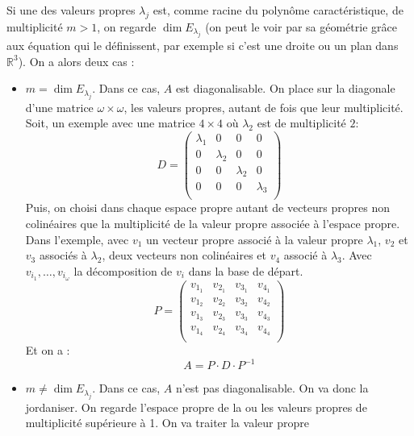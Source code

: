 \documentclass[a4paper,10pt]{article}
\newcommand{\RR}{\mathbb{R}} %
\begin{document}
\begin{enumerate}
      Si une des valeurs propres $\lambda_j$ est, comme racine du
      polynôme caractéristique, de multiplicité $m > 1$, on regarde
      $\dim E_{\lambda_j}$ (on peut le voir par sa géométrie grâce aux
      équation qui le définissent, par exemple si c'est une droite ou
      un plan dans $\RR^3$). On a alors deux cas :
      \begin{itemize}
       \item $m = \dim E_{\lambda_j}$. Dans ce cas, $A$ est
        diagonalisable. On place sur la diagonale d'une matrice $\omega
        \times \omega$, les valeurs propres, autant de fois que leur
        multiplicité. Soit, un exemple avec une matrice $4\times 4$
        où $\lambda_2$ est de multiplicité $2$:
         $$D=
         \begin{pmatrix}
              \lambda_1 & 0         & 0         & 0         \\
              0         & \lambda_2 & 0         & 0         \\
              0         & 0         & \lambda_2 & 0         \\
              0         & 0         & 0         & \lambda_3 \\
             \end{pmatrix}
         $$ Puis, on choisi dans chaque espace propre autant de vecteurs
        propres non colinéaires que la multiplicité de la valeur propre
        associée à l'espace propre. Dans l'exemple, avec $v_1$ un vecteur
        propre associé à la valeur propre $\lambda_1$, $v_2$ et $v_3$
        associés à $\lambda_2$, deux vecteurs non colinéaires et $v_4$
        associé à $\lambda_3$. Avec $v_{i_1},\hdots,v_{i_\omega}$ la
        décomposition de $v_i$ dans la base de départ.  $$P=
        \begin{pmatrix}
              v_{1_1} & v_{2_1} & v_{3_1}  & v_{4_1} \\
              v_{1_2} & v_{2_2} & v_{3_2}  & v_{4_2} \\
              v_{1_3} & v_{2_3} & v_{3_3}  & v_{4_3} \\
              v_{1_4} & v_{2_4} & v_{3_4}  & v_{4_4} \\
             \end{pmatrix}
         $$ Et on a :
         $$A=P\cdot D \cdot P^{-1}$$
       \item $m \neq \dim E_{\lambda_j}$. Dans ce cas, $A$ n'est pas
        diagonalisable. On va donc la jordaniser.
        On regarde l'espace propre de la ou les valeurs propres de
        multiplicité supérieure à 1. On va traiter la valeur propre

\end{itemize}
\end{enumerate}
\end{document}
